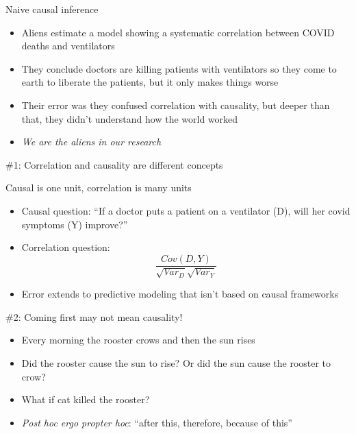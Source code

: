 \documentclass{beamer}
\begin{document}
\begin{frame}{Naive causal inference}

  \begin{itemize}
    \item Aliens estimate a model showing a systematic correlation between COVID deaths and ventilators
    \item They conclude doctors are killing patients with ventilators so they come to earth to liberate the patients, but it only makes things worse
    \item Their error was they confused correlation with causality, but deeper than that, they didn't understand how the world worked
    \item \emph{We are the aliens in our research}
  \end{itemize}

\end{frame}

\begin{frame}{\#1: Correlation and causality are different concepts}

  Causal is one unit, correlation is many units
  \begin{itemize}
    \item Causal question: ``If a doctor puts a patient on a ventilator (D), will her covid symptoms (Y) improve?''
    \item Correlation question:  $$\frac{Cov(D,Y)}{\sqrt{Var_D}\sqrt{{Var_Y}}}$$
    \item Error extends to predictive modeling that isn't based on causal frameworks
  \end{itemize}

\end{frame}



\begin{frame}{\#2: Coming first may not mean causality!}

  \begin{itemize}
    \item Every morning the rooster crows and then the sun rises
    \item Did the rooster cause the sun to rise? Or did the sun cause the rooster to crow?
    \item What if cat killed the rooster?
    \item \emph{Post hoc ergo propter hoc}: ``after this, therefore, because of this''
  \end{itemize}

\end{frame}
\end{document}
